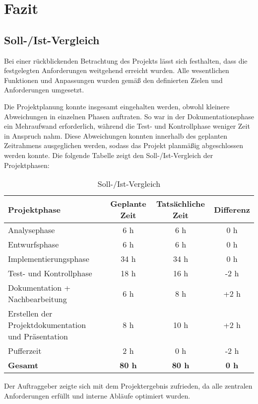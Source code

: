 \section{Fazit} 
\label{sec:Fazit}

\subsection{Soll-/Ist-Vergleich}
\label{sec:SollIstVergleich}

Bei einer rückblickenden Betrachtung des Projekts lässt sich festhalten, dass die festgelegten Anforderungen weitgehend erreicht wurden. Alle wesentlichen Funktionen und Anpassungen wurden gemäß den definierten Zielen und Anforderungen umgesetzt.

Die Projektplanung konnte insgesamt eingehalten werden, obwohl kleinere Abweichungen in einzelnen Phasen auftraten. So war in der Dokumentationsphase ein Mehraufwand erforderlich, während die Test- und Kontrollphase weniger Zeit in Anspruch nahm. Diese Abweichungen konnten innerhalb des geplanten Zeitrahmens ausgeglichen werden, sodass das Projekt planmäßig abgeschlossen werden konnte. Die folgende Tabelle zeigt den Soll-/Ist-Vergleich der Projektphasen:

\begin{table}[h]
\centering
\caption{Soll-/Ist-Vergleich}
\label{tab:Vergleich}
\begin{tabular}{|l|c|c|c|}
\hline
\textbf{Projektphase} & \textbf{Geplante Zeit} & \textbf{Tatsächliche Zeit} & \textbf{Differenz} \\
\hline
Analysephase & 6 h & 6 h & 0 h \\
\hline
Entwurfsphase & 6 h & 6 h & 0 h \\
\hline
Implementierungsphase & 34 h & 34 h & 0 h \\
\hline
Test- und Kontrollphase & 18 h & 16 h & -2 h \\
\hline
Dokumentation + Nachbearbeitung & 6 h & 8 h & +2 h \\
\hline
Erstellen der Projektdokumentation und Präsentation & 8 h & 10 h & +2 h \\
\hline
Pufferzeit & 2 h & 0 h & -2 h \\
\hline
\textbf{Gesamt} & \textbf{80 h} & \textbf{80 h} & \textbf{0 h} \\
\hline
\end{tabular}
\end{table}

Der Auftraggeber zeigte sich mit dem Projektergebnis zufrieden, da alle zentralen Anforderungen erfüllt und interne Abläufe optimiert wurden.

